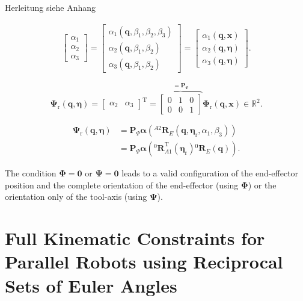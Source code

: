 \documentclass[robotics,article,submit,moreauthors,pdftex]{Definitions/mdpi}
\newcommand{\bm}[1]{\boldsymbol{#1}}
\newcommand{\rotmat}[2]{{{ }^{#1}\boldsymbol{R}}_{#2}}
\newcommand{\transp}[0]{{\mathrm{T}}}
\begin{document}
Herleitung siehe Anhang

\begin{align}
\begin{bmatrix}
\alpha_1 \\
\alpha_2 \\
\alpha_3
\end{bmatrix}
=
\begin{bmatrix}
\alpha_1(\bm{q},\beta_1,\beta_2,\beta_3) \\
\alpha_2(\bm{q},\beta_1,\beta_2) \\
\alpha_3(\bm{q},\beta_1,\beta_2)
\end{bmatrix}
=
\begin{bmatrix}
\alpha_1(\bm{q},\bm{x}) \\
\alpha_2(\bm{q},\bm{\eta}) \\
\alpha_3(\bm{q},\bm{\eta}) 
\end{bmatrix}
\label{equ:alpha_dep_beta}.
\end{align}


\begin{equation}
\bm{\Psi}_{\mathrm{r}}(\bm{q},\bm{\eta}) = 
\begin{bmatrix}
\alpha_2  & \alpha_3
\end{bmatrix}^\transp
=
\overbrace{\begin{bmatrix}
    0 & 1 & 0  \\ 
    0 & 0 & 1
    \end{bmatrix}}^{=\bm{P}_{\Psi}}
\bm{\Phi}_{\mathrm{r}} (\bm{q},\bm{x})
\in {\mathbb{R}}^{2}.
\label{equ:Psir_def}
\end{equation}


\begin{align}
\bm{\Psi}_{\mathrm{r}}(\bm{q},\bm{\eta})
&=
\bm{P}_{\Psi} \bm{\alpha}\left(\rotmat{A2}{E}(\bm{q},\bm{\eta}_{\mathrm{r}},\alpha_1,\beta_3)\right) \nonumber\\
&=
\bm{P}_{\Psi} \bm{\alpha}\left(\rotmat{0}{A1}^\transp (\bm{\eta}_{\mathrm{r}})\rotmat{0}{E}(\bm{q})\right).
\end{align}


The condition $\bm{\Phi}=\bm{0}$ or $\bm{\Psi}=\bm{0}$ leads to a valid configuration of the end-effector position and the complete orientation of the end-effector (using $\bm{\Phi}$) or the orientation only of the tool-axis (using $\bm{\Psi}$).





\section{Full Kinematic Constraints for Parallel Robots using Reciprocal Sets of Euler Angles}
\label{sec:ZB_PKM}
\end{document}
